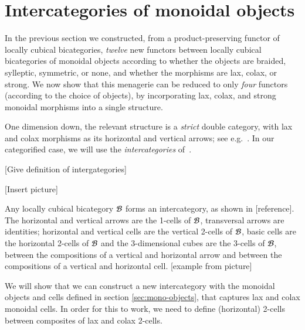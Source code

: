 \section{Intercategories of monoidal objects}
\label{sec:intercat}

In the previous section we constructed, from a product-preserving functor of locally cubical bicategories, \emph{twelve} new functors between locally cubical bicategories of monoidal objects according to whether the objects are braided, sylleptic, symmetric, or none, and whether the morphisms are lax, colax, or strong.
We now show that this menagerie can be reduced to only \emph{four} functors (according to the choice of objects), by incorporating lax, colax, and strong monoidal morphisms into a single structure.

One dimension down, the relevant structure is a \emph{strict} double category, with lax and colax morphisms as its horizontal and vertical arrows; see e.g.~\cite{gp:double-adjoints,shulman:dblderived}.
In our categorified case, we will use the \emph{intercategories} of~\cite{gp:intercategories-i,gp:intercategories-ii}.

[Give definition of intergategories]

[Insert picture]

Any locally cubical bicategory $\mathcal{B}$ forms an intercategory, as shown in [reference]. The horizontal and vertical arrows are the 1-cells of $\mathcal{B}$, transversal arrows are identities; horizontal and vertical cells are the vertical 2-cells of $\mathcal{B}$, basic cells are the horizontal 2-cells of $\mathcal{B}$ and the 3-dimensional cubes are the 3-cells of $\mathcal{B}$, between the compositions of a vertical and horizontal arrow and between the compositions of a vertical and horizontal cell. [example from picture]

We will show that we can construct a new intercategory with the monoidal objects and cells defined in section \ref{sec:mono-objects}, that captures lax and colax monoidal cells. In order for this to work, we need to define (horizontal) 2-cells between composites of lax and colax 2-cells.

